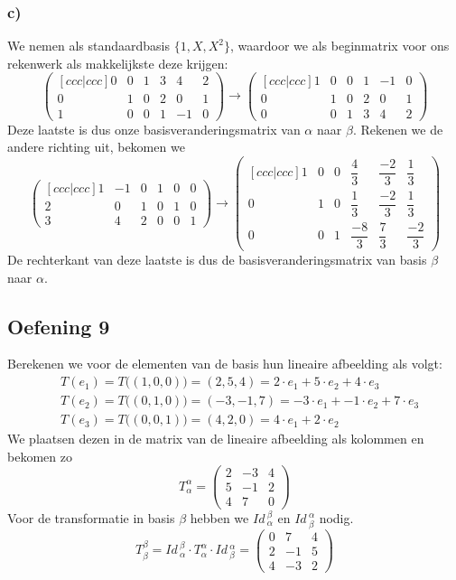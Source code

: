 \documentclass[lineaire_algebra_oplossingen.tex]{subfiles}
\begin{document}
\subsubsection*{c)}
We nemen als standaardbasis $\{1, X, X^2\}$, waardoor we als beginmatrix voor ons rekenwerk als makkelijkste deze krijgen:
\[
\begin{pmatrix}[ccc|ccc]
0 & 0 & 1 & 3 & 4 & 2\\
0 & 1 & 0 & 2 & 0 & 1\\
1 & 0 & 0 & 1 & -1 & 0
\end{pmatrix}
\longrightarrow
\begin{pmatrix}[ccc|ccc]
1 & 0 & 0 & 1 & -1 & 0\\
0 & 1 & 0 & 2 & 0 & 1\\
0 & 0 & 1 & 3 & 4 & 2
\end{pmatrix}
\]
Deze laatste is dus onze basisveranderingsmatrix van $\alpha$ naar $\beta$. Rekenen we de andere richting uit, bekomen we
\[
\begin{pmatrix}[ccc|ccc]
1 & -1 & 0 & 1 & 0 & 0\\
2 & 0 & 1 & 0 & 1 & 0\\
3 & 4 & 2 & 0 & 0 & 1
\end{pmatrix}
\longrightarrow
\begin{pmatrix}[ccc|ccc]
1 & 0 & 0 & \dfrac{4}{3}  & \dfrac{-2}{3}  & \dfrac{1}{3}\\[8pt]
0 & 1 & 0 & \dfrac{1}{3}  & \dfrac{-2}{3} & \dfrac{1}{3}\\[8pt]
0 & 0 & 1 & \dfrac{-8}{3} & \dfrac{7}{3}  & \dfrac{-2}{3}
\end{pmatrix}
\]
De rechterkant van deze laatste is dus de basisveranderingsmatrix van basis $\beta$ naar $\alpha$.

\subsection{Oefening 9}
Berekenen we voor de elementen van de basis hun lineaire afbeelding als volgt:
\begin{align*}
& T(e_1) = T\big( (1,0,0) \big) = (2,5,4) = 2 \cdot e_1 + 5 \cdot e_2 + 4 \cdot e_3 \\
& T(e_2) = T\big( (0,1,0) \big) = (-3,-1,7) = -3 \cdot e_1 + -1 \cdot e_2 + 7 \cdot e_3 \\
& T(e_3) = T\big( (0,0,1) \big) = (4,2,0) = 4 \cdot e_1 + 2 \cdot e_2
\end{align*}
We plaatsen dezen in de matrix van de lineaire afbeelding als kolommen en bekomen zo
\[
T^\alpha_\alpha =
\begin{pmatrix}
2 & -3 & 4\\
5 & -1 & 2\\
4 &  7 & 0
\end{pmatrix}
\]
Voor de transformatie in basis $\beta$ hebben we $\textit{Id}\,_\alpha^\beta$ en $\textit{Id}\,_\beta^\alpha$ nodig.
\[
T^\beta_\beta =
\textit{Id}\,_\alpha^\beta
\cdot
T^\alpha_\alpha
\cdot
\textit{Id}\,_\beta^\alpha
=
\begin{pmatrix}
0 &  7 & 4 \\
2 & -1 & 5 \\
4 & -3 & 2
\end{pmatrix}
\]
\end{document}
